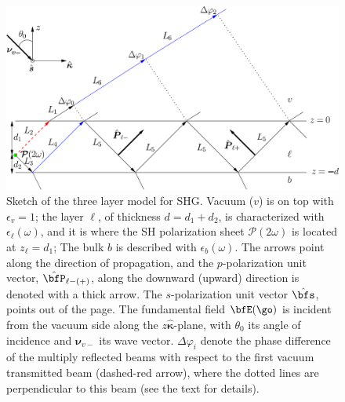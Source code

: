 \begin{figure}[t]
\centering 
\includegraphics[scale=.5]{figures/multi}
\caption{Sketch of the three layer model for SHG. Vacuum ($v$) is on top with
$\epsilon_v=1$; the layer $\ell$, of thickness $d=d_1+d_2$, is characterized
with $\epsilon_{\ell}(\omega)$, and it is where the SH polarization sheet
$\boldsymbol{\mathcal{P}}(2\omega)$ is located at $z_\ell=d_1$; The bulk $b$ is
described with $\epsilon_{b}(\omega)$. The arrows point along the direction of
propagation, and the $p$-polarization unit vector, $\hat\bfP_{\ell -(+)}$, along
the downward (upward) direction is denoted with a thick arrow. The
$s$-polarization unit vector $\hat\bfs$, points out of the page. The fundamental
field $\bfE(\go)$ is incident from the vacuum side along the
$z\hat{\boldsymbol{\kappa}}$-plane, with $\theta_0$ its angle of incidence and
$\boldsymbol{\nu}_{v-}$ its wave vector. $\Delta\varphi_{i}$ denote the phase
difference of the multiply reflected beams with respect to the first vacuum
transmitted beam (dashed-red arrow), where the dotted lines are perpendicular to
this beam (see the text for details).\label{3layer}}
\end{figure}

